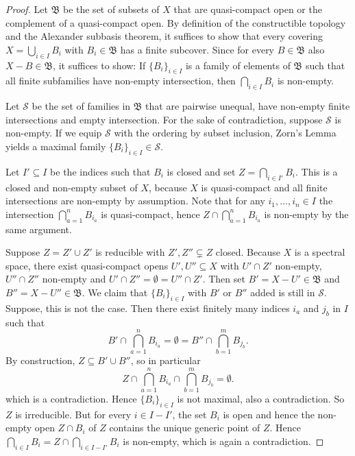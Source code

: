 \begin{proof}
    Let $\mathfrak{B}$ be the set of subsets of $X$ that are quasi-compact open or
    the complement of a quasi-compact open.
    By definition of the constructible topology and the Alexander subbasis theorem,
    it suffices to show that every covering $X = \bigcup_{i \in  I} B_i$
    with $B_i \in \mathfrak{B}$ has a finite subcover. Since
    for every $B \in \mathfrak{B}$ also $X - B \in \mathfrak{B}$,
    it suffices to show: If $\{B_i\}_{i \in I}$ is a family of elements
    of $\mathfrak{B}$ such that all finite subfamilies have non-empty intersection,
    then $\bigcap_{i \in  I} B_i$ is non-empty.

    Let $\mathcal{S}$ be the set of families in $\mathfrak{B}$ that are pairwise unequal, have non-empty
    finite intersections and empty intersection. For the sake of contradiction, suppose
    $\mathcal{S}$ is non-empty. If we equip $\mathcal{S}$ with the ordering by subset inclusion,
    Zorn's Lemma yields a maximal family $\{B_i\}_{i \in I} \in \mathcal{S}$.

    Let $I' \subseteq I$ be the indices such that $B_i$ is closed and set $Z = \bigcap_{i \in  I'} B_i$.
    This is a closed and non-empty subset of $X$, because $X$ is quasi-compact
    and all finite intersections are non-empty by assumption.
    Note that for any $i_1, \ldots, i_n \in I$ the intersection $\bigcap_{a=1}^n B_{i_a}$ is quasi-compact,
    hence $Z \cap \bigcap_{a=1}^n B_{i_a}$ is non-empty by the same argument.

    Suppose $Z = Z' \cup Z'$ is reducible with $Z', Z'' \subsetneq Z$ closed. Because
    $X$ is a spectral space, there exist quasi-compact opens $U', U'' \subseteq X$ with
    $U' \cap Z'$ non-empty, $U'' \cap Z''$ non-empty and $U' \cap Z'' = \emptyset = U'' \cap Z'$.
    Then set $B' = X - U' \in \mathfrak{B}$ and $B'' = X - U'' \in \mathfrak{B}$. We
    claim that $\{B_i\}_{i \in I}$ with $B'$ or $B''$ added is still in $\mathcal{S}$. Suppose,
    this is not the case. Then there exist finitely many indices
    $i_a$ and $j_b$ in $I$ such that
    \[
    B' \cap \bigcap_{a=1}^n B_{i_a} = \emptyset = B'' \cap \bigcap_{b=1}^m B_{j_b}
    .\] By construction, $Z \subseteq B' \cup B''$, so in particular
    \[
    Z \cap \bigcap_{a=1}^n B_{i_a} \cap \bigcap_{b=1}^m B_{j_b} = \emptyset
    .\] which is a contradiction. Hence $\{B_i\}_{i \in I}$ is not maximal, also a contradiction. So
    $Z$ is irreducible. But for every $i \in I - I'$, the set $B_i$ is open and hence
    the non-empty open $Z \cap B_i$ of $Z$ contains the unique generic point of $Z$. Hence
    $\bigcap_{i \in  I} B_i = Z \cap \bigcap_{i \in  I - I'} B_i$ is non-empty, which is again a contradiction.
    \leanok
\end{proof}

